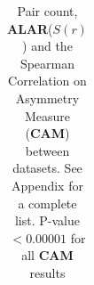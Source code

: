 \documentclass[letterpaper]{article} %
\begin{document}
\begin{table}
\begin{tabular}{@{}c|cc|cc|cc|ccc@{}}
\end{tabular}
\caption{Pair count, \textbf{ALAR}($S(r)$) and the Spearman Correlation on Asymmetry Measure (\textbf{CAM}) between datasets. See Appendix for a complete list. P-value$<0.00001$ for all \textbf{CAM} results}

\label{tab:1}
\end{table}
\end{document}
